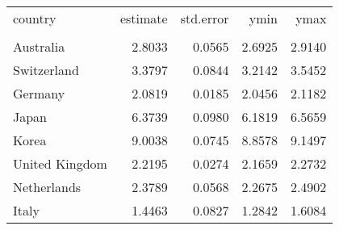 \begin{tabular}{lrrrr}
   \toprule 
 
country & estimate & std.error & ymin & ymax \\ 

\cmidrule(lr){1-5} 
 
\\[-1.8ex]  
 
Australia & 2.8033 & 0.0565 & 2.6925 & 2.9140 \\ 
  Switzerland & 3.3797 & 0.0844 & 3.2142 & 3.5452 \\ 
  Germany & 2.0819 & 0.0185 & 2.0456 & 2.1182 \\ 
  Japan & 6.3739 & 0.0980 & 6.1819 & 6.5659 \\ 
  Korea & 9.0038 & 0.0745 & 8.8578 & 9.1497 \\ 
  United Kingdom & 2.2195 & 0.0274 & 2.1659 & 2.2732 \\ 
  Netherlands & 2.3789 & 0.0568 & 2.2675 & 2.4902 \\ 
  Italy & 1.4463 & 0.0827 & 1.2842 & 1.6084 \\ 
   \bottomrule  
\end{tabular}
